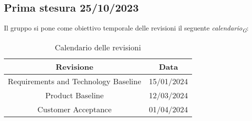 \subsection{Prima stesura 25/10/2023}
Il gruppo si pone come obiettivo temporale delle revisioni il seguente \textit{calendario}\textsubscript{\textit{G}}:
\begin{table}[ht]
    \centering
    \begin{tabular}{|c|c|}
        \hline
        \textbf{Revisione} & \textbf{Data} \\
        \hline
        Requirements and Technology Baseline & 15/01/2024 \\
        Product Baseline  & 12/03/2024 \\
        Customer Acceptance & 01/04/2024 \\
        \hline
    \end{tabular}
    \caption{Calendario delle revisioni}
\end{table}